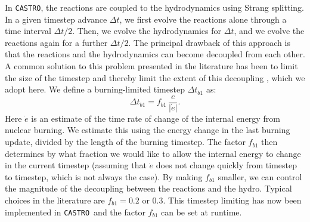 \documentclass[twocolumn,numberedappendix]{../aastex6}
\newcommand{\castro}{\texttt{CASTRO}}
\begin{document}
In \castro, the reactions are coupled to the hydrodynamics using Strang splitting.
In a given timestep advance $\Delta t$, we first evolve the reactions alone through
a time interval $\Delta t / 2$. Then, we evolve the hydrodynamics for $\Delta t$,
and we evolve the reactions again for a further $\Delta t / 2$. The principal
drawback of this approach is that the reactions and the hydrodynamics can become
decoupled from each other. A common solution to this problem presented in
the literature has been to limit the size of the timestep and thereby limit the
extent of this decoupling \citep{raskin:2010,hawley:2012}, which we adopt here.
We define a burning-limited timestep $\Delta t_{b1}$ as:
\begin{equation}
  \Delta t_{b1} = f_{b1}\, \frac{e}{|\dot{e}|}.
\end{equation}
Here $\dot{e}$ is an estimate of the time rate of change of the internal energy
from nuclear burning. We estimate this using the energy change in the last burning
update, divided by the length of the burning timestep. The factor $f_{b1}$ then
determines by what fraction we would like to allow the internal energy to change
in the current timestep (assuming that $\dot{e}$ does not change quickly from
timestep to timestep, which is not always the case). By making $f_{b1}$ smaller,
we can control the magnitude of the decoupling between the reactions and the hydro.
Typical choices in the literature are $f_{b1} = 0.2$ or $0.3$. This timestep limiting has
now been implemented in \castro\ and the factor $f_{b1}$ can be set at runtime.
\end{document}
